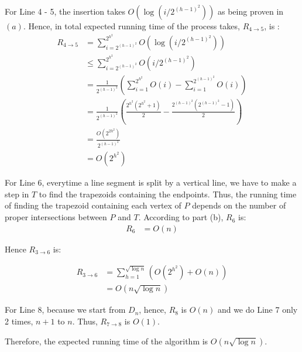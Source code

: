 For Line 4 - 5, the insertion takes $O(\log(i/2^{(h-1)^2}))$ as being proven in $(a)$. Hence, in total
expected running time of the process takes, $R_{4\rightarrow5}$, is :
\begin{align*}
R_{4\rightarrow5} &= \sum_{i=2^{(h-1)^2}}^{2^{h^2}}O(\log(i/2^{(h-1)^2})) \\
&\le \sum_{i=2^{(h-1)^2}}^{2^{h^2}}O(i/2^{(h-1)^2}) \\
&= \frac{1}{2^{(h-1)^2}} ( \sum_{i=1}^{2^{h^2}}O(i) - \sum_{i=1}^{2^{(h-1)^2}}O(i) ) \\
&= \frac{1}{2^{(h-1)^2}} ( \frac{2^{h^2}(2^{h^2} + 1)}{2} - \frac{2^{(h-1)^2}(2^{(h-1)^2} - 1)}{2} ) \\
&= \frac{O(2^{2h^2})}{2^{(h-1)^2}} \\
&= O(2^{h^2})
\end{align*}

For Line 6, everytime a line segment is split by a vertical line, we have to make a step in $T$ to find the trapezoids containing the endpoints. Thus, the running time of finding the trapezoid containing each vertex of $P$ depends
on the number of proper intersections between $P$ and $T$. According to part (b), $R_{6}$ is:
\begin{align*}
    R_6 &= O(n)
\end{align*}

Hence $R_{3\rightarrow6}$ is:

\begin{align*}
    R_{3\rightarrow6} &= \sum_{h=1}^{\sqrt{\log{n}}}( O(2^{h^2}) + O(n) ) \\
    &= O(n\sqrt{\log{n}})
\end{align*}

For Line 8, because we start from $D_{n}$, hence, $R_{8}$ is $O(n)$ and we do Line 7 only
2 times, $n+1$ to $n$. Thus, $R_{7\rightarrow8}$ is $O(1)$.

Therefore, the expected running time of the algorithm is $O(n\sqrt{\log{n}})$.
